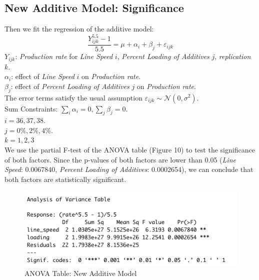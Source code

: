 \documentclass[11pt,a4paper]{article}
\begin{document}
\subsection{New Additive Model: Significance}
Then we fit the regression of the additive model:
$$\frac{Y_{ijk}^{5.5}-1}{5.5}=\mu+\alpha_i+\beta_j+\varepsilon_{ijk}$$
$Y_{ijk}$: \textit{Production rate} for \textit{Line Speed} $i$, \textit{Percent Loading of Additives} $j$, \textit{replication} $k$.\\
$\alpha_i$: effect of \textit{Line Speed} $i$ on \textit{Production rate}.\\
$\beta_j$: effect of \textit{Percent Loading of Additives} $j$ on \textit{Production rate}.\\
The error terms satisfy the usual assumption $\varepsilon_{i j k} \sim \mathcal{N}\left(0, \sigma^{2}\right)$.\\
Sum Constraints: $\sum_{i} \alpha_{i}=0, \sum_{j} \beta_{j}=0$.\\
$i=36,37,38.$\\
$j=0\%,2\%,4\%.$\\
$k=1,2,3$\\

We use the partial F-test of the ANOVA table (Figure 10) to test the significance of both factors. Since the p-values of both factors are lower than 0.05 (\textit{Line Speed}: 0.0067840, \textit{Percent Loading of Additives}: 0.0002654), we can conclude that both factors are statistically significant.
\begin{figure}[htb]
    \centering
    \includegraphics[scale=0.8]{add2.png}
    \caption{ANOVA Table: New Additive Model}
    \label{}
\end{figure}
\end{document}
